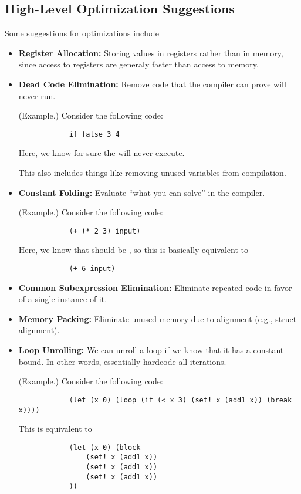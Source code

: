 \documentclass[letterpaper]{article}
\begin{document}
\subsection{High-Level Optimization Suggestions}
Some suggestions for optimizations include 
\begin{itemize}
    \item \textbf{Register Allocation:} Storing values in registers rather than in memory, since access to registers are generaly faster than access to memory. 
    \item \textbf{Dead Code Elimination:} Remove code that the compiler can prove will never run.
    \begin{mdframed}
        (Example.) Consider the following code: 
        \begin{verbatim}
            if false 3 4 \end{verbatim}
        Here, we know for sure the  will never execute.
    \end{mdframed}
    This also includes things like removing unused variables from compilation. 

    \item \textbf{Constant Folding:} Evaluate ``what you can solve'' in the compiler. 
    \begin{mdframed}
        (Example.) Consider the following code:
        \begin{verbatim}
            (+ (* 2 3) input)\end{verbatim}
        Here, we know that  should be , so this is basically equivalent to 
        \begin{verbatim}
            (+ 6 input)\end{verbatim}
    \end{mdframed}

    \item \textbf{Common Subexpression Elimination:} Eliminate repeated code in favor of a single instance of it. 
    \item \textbf{Memory Packing:} Eliminate unused memory due to alignment (e.g., struct alignment).
    \item \textbf{Loop Unrolling:} We can unroll a loop if we know that it has a constant bound. In other words, essentially hardcode all iterations.
    \begin{mdframed}
        (Example.) Consider the following code: 
        \begin{verbatim}
            (let (x 0) (loop (if (< x 3) (set! x (add1 x)) (break x))))\end{verbatim}
        This is equivalent to  
        \begin{verbatim}
            (let (x 0) (block 
                (set! x (add1 x))
                (set! x (add1 x))
                (set! x (add1 x))
            ))\end{verbatim}
    \end{mdframed}


\end{itemize}
\end{document}

